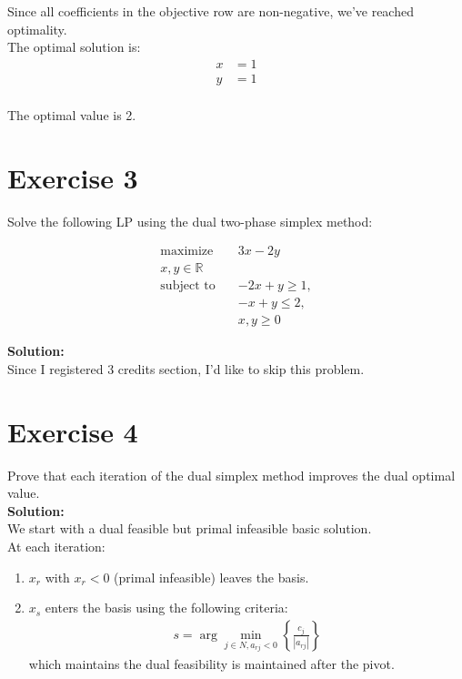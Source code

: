 \documentclass{article}
\begin{document}
Since all coefficients in the objective row are non-negative, we've reached optimality. \\

The optimal solution is:
\begin{align*}
x &= 1\\
y &= 1\\
\end{align*}

The optimal value is 2.

\newpage

\section*{Exercise 3}
Solve the following LP using the dual two-phase simplex method:

\begin{align*}
\text{maximize} \quad & 3x - 2y\\
x, y \in \mathbb{R} \quad & \\
\text{subject to} \quad & -2x + y \geq 1,\\
& -x + y \leq 2,\\
& x, y \geq 0
\end{align*}

\textbf{Solution:} \\

Since I registered 3 credits section, I'd like to skip this problem.

\newpage

\section*{Exercise 4}
Prove that each iteration of the dual simplex method improves the dual optimal value. \\

\textbf{Solution:} \\

We start with a dual feasible but primal infeasible basic solution. \\

At each iteration:
\begin{enumerate}
    \item $x_r$ with $x_r < 0$ (primal infeasible) leaves the basis.
    \item $x_s$ enters the basis using the following criteria:
\begin{align*}
s = \arg\min_{j \in N, a_{rj} < 0} \left\{ \frac{c_j}{|a_{rj}|} \right\}
\end{align*}
which maintains the dual feasibility is maintained after the pivot.
\end{enumerate}
\end{document}
